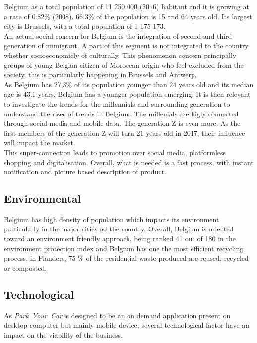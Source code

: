 \documentclass[12pt,a4paper,oneside]{book}
\newcommand{\bp}{\textit{Park~Your~Car }}
\begin{document}
Belgium as a total population of 11 250 000 (2016) habitant and it is growing at a rate of 0.82\% (2008). 66.3\% of the population is 15 and 64 years old. Its largest city is Brussels, with a total population of 1 175 173\cite{ciafb}.\\

An actual social concern for Belgium is the integration of second and third generation of immigrant. A part of this segment is not integrated to the country whether socioeconomicly of culturally. This phenomenon concern principally groups of young Belgian citizen of Moroccan origin who feel excluded from the society, this is particularly happening in Brussels and Antwerp\cite{sgikc}.\\

As Belgium has 27,3\% of its population younger than 24 years old and its median age is 43.1 years, Belgium has a younger population emerging\cite{ciafb}. It is then relevant to investigate the trends for the millennials and surrounding generation to understand the rises of trends in Belgium. The millenials are higly connected through social media and mobile data. The generation Z is even more. As the first members of the generation Z will turn 21 years old in 2017, their influence will impact the market.\\
This super-connection leads to promotion over social media, platformless shopping and digitalisation. Overall, what is needed is a fast process, with instant notification and picture based description of product\cite{stbe}.



\subsection{Environmental}

Belgium has high density of population which impacts its environment particularly in the major cities od the country. Overall, Belgium is oriented toward an environment friendly approach, being ranked 41 out of 180 in the environment protection index\cite{epi} and Belgium has one the most efficient recycling process, in Flanders, 75 \% of the residential waste produced are reused, recycled or composted\cite{wastemana}.

\subsection{Technological}
As \bp is designed to be an on demand application present on desktop computer but mainly mobile device, several technological factor have an impact on the viability of the business.\\
\end{document}
